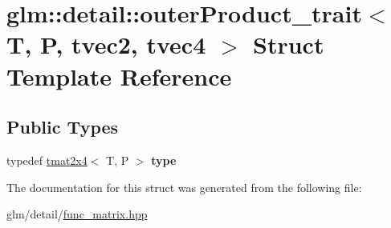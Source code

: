 \hypertarget{structglm_1_1detail_1_1outerProduct__trait_3_01T_00_01P_00_01tvec2_00_01tvec4_01_4}{\section{glm\-:\-:detail\-:\-:outer\-Product\-\_\-trait$<$ T, P, tvec2, tvec4 $>$ Struct Template Reference}
\label{structglm_1_1detail_1_1outerProduct__trait_3_01T_00_01P_00_01tvec2_00_01tvec4_01_4}
}
\subsection*{Public Types}
\begin{DoxyCompactItemize}
\item 
\hypertarget{structglm_1_1detail_1_1outerProduct__trait_3_01T_00_01P_00_01tvec2_00_01tvec4_01_4_a5ca49ab58d1c30d858b622c06147cd57}{typedef \hyperlink{structglm_1_1tmat2x4}{tmat2x4}$<$ T, P $>$ {\bfseries type}}\label{structglm_1_1detail_1_1outerProduct__trait_3_01T_00_01P_00_01tvec2_00_01tvec4_01_4_a5ca49ab58d1c30d858b622c06147cd57}

\end{DoxyCompactItemize}


The documentation for this struct was generated from the following file\-:\begin{DoxyCompactItemize}
\item 
glm/detail/\hyperlink{func__matrix_8hpp}{func\-\_\-matrix.\-hpp}\end{DoxyCompactItemize}
